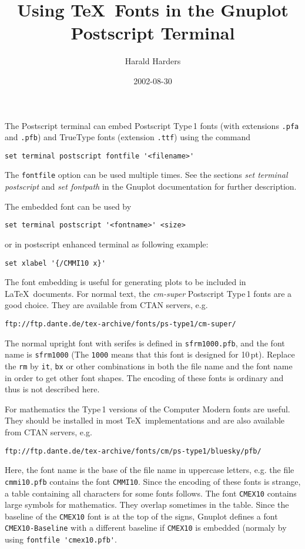 \documentclass[a4paper,10pt]{article}
\begin{document}
\title{Using \TeX\ Fonts in the Gnuplot Postscript Terminal}
\author{Harald Harders}
\date{2002-08-30}
\maketitle

The Postscript terminal can embed Postscript Type\,1 fonts (with
extensions \verb|.pfa| and \verb|.pfb|) and TrueType fonts (extension
\verb|.ttf|) using the command
\begin{verbatim}
set terminal postscript fontfile '<filename>'
\end{verbatim}
The \verb|fontfile| option can be used multiple times.
See the sections \emph{set terminal postscript} and \emph{set
  fontpath} in the Gnuplot documentation for further description.

The embedded font can be used by 
\begin{verbatim}
set terminal postscript '<fontname>' <size>
\end{verbatim}
or in postscript enhanced terminal as following example:
\begin{verbatim}
set xlabel '{/CMMI10 x}'
\end{verbatim}

The font embedding is useful for generating plots to be included in
\LaTeX\ documents. 
For normal text, the \emph{cm-super} Postscript Type\,1 fonts are a
good choice. 
They are available from CTAN servers, e.g.
\begin{verbatim}
ftp://ftp.dante.de/tex-archive/fonts/ps-type1/cm-super/
\end{verbatim}
The normal upright font with serifes is defined in
\verb|sfrm1000.pfb|, and the font name is \verb|sfrm1000| (The
\verb|1000| means that this font is designed for 10\,pt).
Replace the \verb|rm| by \verb|it|, \verb|bx| or other combinations in
both the file name and the font name in order to get other font
shapes.
The encoding of these fonts is ordinary and thus is not described here.

For mathematics the Type\,1 versions of the Computer Modern fonts are
useful.
They should be installed in most \TeX\ implementations and are also
available from CTAN servers, e.g.
\begin{verbatim}
ftp://ftp.dante.de/tex-archive/fonts/cm/ps-type1/bluesky/pfb/
\end{verbatim}
Here, the font name is the base of the file name in uppercase letters,
e.g. the file \verb|cmmi10.pfb| contains the font \verb|CMMI10|.
Since the encoding of these fonts is strange, a table containing all
characters for some fonts follows.
The font \verb|CMEX10| contains large symbols for mathematics. They
overlap sometimes in the table. Since the baseline of the
\verb|CMEX10| font is at the top of the signs, Gnuplot defines a font
\verb|CMEX10-Baseline| with a different baseline if \verb|CMEX10| is
embedded (normaly by using \verb|fontfile 'cmex10.pfb'|.
\end{document}
